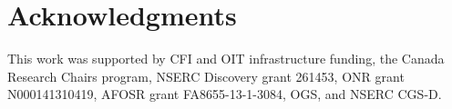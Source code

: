 \documentclass[10pt,letterpaper]{article}
\begin{document}
\section{Acknowledgments}
This work was supported by CFI and OIT infrastructure funding, the Canada Research Chairs program, NSERC Discovery grant 261453, ONR grant N000141310419, AFOSR grant FA8655-13-1-3084, OGS, and NSERC CGS-D.



\setlength{\bibleftmargin}{.125in}
\setlength{\bibindent}{-\bibleftmargin}


\end{document}
